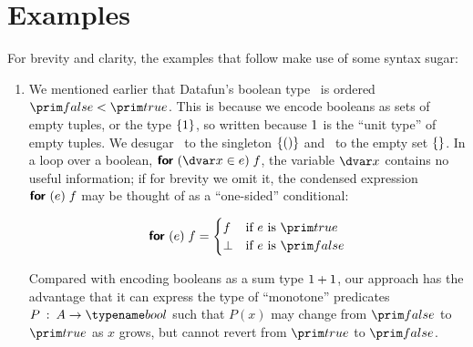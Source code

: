 \newcommand\mem{\name{member}}

\newcommand\notmember[2]{\neg \ebox{\mem \<\ebox{#1} \<{#2}}}

\section{Examples}
\label{examples}



For brevity and clarity, the examples that follow make use of some syntax sugar:

\begin{enumerate}

\item We mentioned earlier that Datafun's boolean type \tbool\ is ordered
  $\efalse < \etrue$. This is because we encode booleans as sets of empty
  tuples, or the type $\{{1}\}$, so written because $1$ is the ``unit
  type'' of empty tuples. We desugar \etrue\ to the singleton
  $\{{({})}\}$ and \efalse\ to the empty set $\{{}\}$. In a loop
  over a boolean, $\eforvar x e f$, the variable $\dvar x$ contains no useful
  information; if for brevity we omit it, the condensed expression $\textsf{\bfseries for}_{}\;({e})\; f$
  may be thought of as a ``one-sided'' conditional:


  \begin{equation*}
    \efor{e} f =
    \begin{cases}
      f & \text{if }e\text{ is }\etrue\\
      \bot & \text{if }e\text{ is }\efalse
    \end{cases}
  \end{equation*}

  Compared with encoding booleans as a sum type \(1 + 1\), our
  approach has the advantage that it can express the type of ``monotone''
  predicates $P \isa A \to \tbool$ such that $P(x)$ may change from $\efalse$ to
  $\etrue$ as $x$ grows, but cannot revert from $\etrue$ to $\efalse$.



\end{enumerate}
